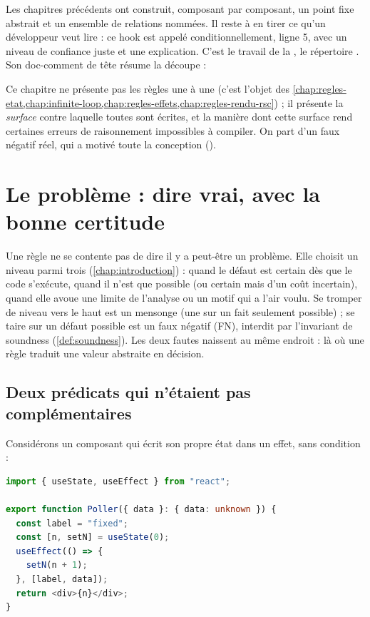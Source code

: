Les chapitres précédents ont construit, composant par composant, un point fixe abstrait et un ensemble de relations nommées. Il reste à en tirer ce qu'un développeur veut lire : \og ce hook est appelé conditionnellement, ligne 5\fg{}, avec un niveau de confiance juste et une explication. C'est le travail de la , le répertoire . Son doc-comment de tête résume la découpe :


Ce chapitre ne présente pas les règles une à une (c'est l'objet des \cref{chap:regles-etat,chap:infinite-loop,chap:regles-effets,chap:regles-rendu-rsc}) ; il présente la \emph{surface} contre laquelle toutes sont écrites, et la manière dont cette surface rend certaines erreurs de raisonnement impossibles à compiler. On part d'un faux négatif réel, qui a motivé toute la conception ().

\section{Le problème : dire vrai, avec la bonne certitude}
\label{sec:api-regles-probleme}

Une règle ne se contente pas de dire \og il y a peut-être un problème\fg{}. Elle choisit un niveau parmi trois (\cref{chap:introduction}) : \Error{} quand le défaut est certain dès que le code s'exécute, \Warning{} quand il n'est que possible (ou certain mais d'un coût incertain), \Info{} quand elle avoue une limite de l'analyse ou un motif qui a l'air voulu. Se tromper de niveau vers le haut est un mensonge (une \Error{} sur un fait seulement possible) ; se taire sur un défaut possible est un faux négatif (FN), interdit par l'invariant de soundness (\cref{def:soundness}). Les deux fautes naissent au même endroit : là où une règle traduit une valeur abstraite en décision.

\subsection{Deux prédicats qui n'étaient pas complémentaires}

Considérons un composant qui écrit son propre état dans un effet, sans condition :

\begin{lstlisting}[language=TypeScript,caption={Un effet qui s'auto-relance tant que \code{data} bouge (\file{/tmp/ch17/topdep.tsx})},label={lst:api-regles-topdep}]
import { useState, useEffect } from "react";

export function Poller({ data }: { data: unknown }) {
  const label = "fixed";
  const [n, setN] = useState(0);
  useEffect(() => {
    setN(n + 1);
  }, [label, data]);
  return <div>{n}</div>;
}
\end{lstlisting}

